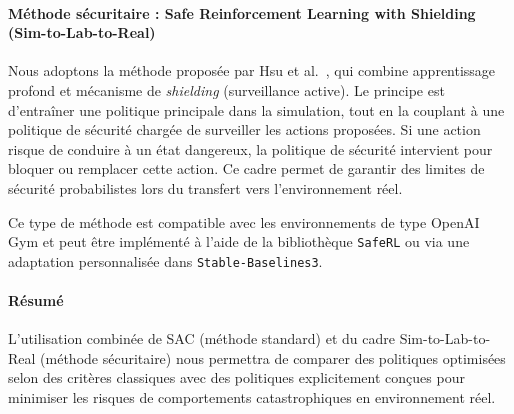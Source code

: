 \documentclass{article}
\begin{document}
\paragraph{Méthode sécuritaire : Safe Reinforcement Learning with Shielding (Sim-to-Lab-to-Real)}
Nous adoptons la méthode proposée par Hsu et al.~\cite{hsu2022sim2real}, qui combine apprentissage profond et mécanisme de \textit{shielding} (surveillance active). Le principe est d’entraîner une politique principale dans la simulation, tout en la couplant à une politique de sécurité chargée de surveiller les actions proposées. Si une action risque de conduire à un état dangereux, la politique de sécurité intervient pour bloquer ou remplacer cette action. Ce cadre permet de garantir des limites de sécurité probabilistes lors du transfert vers l’environnement réel.

Ce type de méthode est compatible avec les environnements de type OpenAI Gym et peut être implémenté à l’aide de la bibliothèque \texttt{SafeRL} ou via une adaptation personnalisée dans \texttt{Stable-Baselines3}.

\paragraph{Résumé}
L’utilisation combinée de SAC (méthode standard) et du cadre Sim-to-Lab-to-Real (méthode sécuritaire) nous permettra de comparer des politiques optimisées selon des critères classiques avec des politiques explicitement conçues pour minimiser les risques de comportements catastrophiques en environnement réel.



\end{document}
